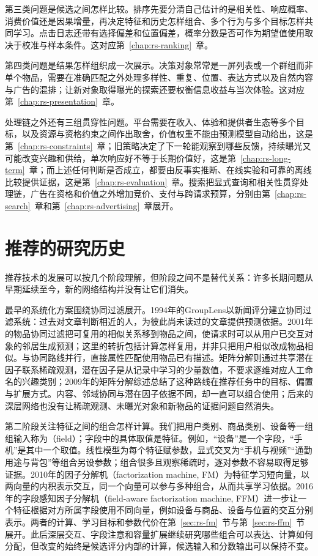第三类问题是候选之间怎样比较。排序先要分清自己估计的是相关性、响应概率、消费价值还是因果增量，再决定特征和历史怎样组合、多个行为与多个目标怎样共同学习。点击日志还带有选择偏差和位置偏差，概率分数是否可作为期望值使用取决于校准与样本条件。这对应第~\ref{chap:rs-ranking}~章。

第四类问题是结果怎样组织成一次展示。决策对象常常是一屏列表或一个群组而非单个物品，需要在准确匹配之外处理多样性、重复、位置、表达方式以及自然内容与广告的混排；让新对象取得曝光的探索还要权衡信息收益与当次体验。这对应第~\ref{chap:rs-presentation}~章。

处理链之外还有三组贯穿性问题。平台需要在收入、体验和提供者生态等多个目标，以及资源与资格约束之间作出取舍，价值权重不能由预测模型自动给出，这是第~\ref{chap:rs-constraints}~章；旧策略决定了下一轮能观察到哪些反馈，持续曝光又可能改变兴趣和供给，单次响应好不等于长期价值好，这是第~\ref{chap:rs-long-term}~章；而上述任何判断是否成立，都要由反事实推断、在线实验和可靠的离线比较提供证据，这是第~\ref{chap:rs-evaluation}~章。搜索把显式查询和相关性贯穿处理链，广告在资格和价值之外增加竞价、支付与跨请求预算，分别由第~\ref{chap:rs-search}~章和第~\ref{chap:rs-advertising}~章展开。

\section{推荐的研究历史}
\label{sec:rs-development}

推荐技术的发展可以按几个阶段理解，但阶段之间不是替代关系：许多长期问题从早期延续至今，新的网络结构并没有让它们消失。

最早的系统化方案围绕协同过滤展开。1994年的GroupLens以新闻评分建立协同过滤系统：过去对文章判断相近的人，为彼此尚未读过的文章提供预测依据。2001年的物品协同过滤把可复用的相似关系移到物品之间，使请求时可以从用户已交互对象的邻居生成预测；这里的转折包括计算怎样复用，并非只把用户相似改成物品相似。与协同路线并行，直接属性匹配使用物品已有描述。矩阵分解则通过共享潜在因子联系稀疏观测，潜在因子是从记录中学习的少量数值，不要求逐维对应人工命名的兴趣类别；2009年的矩阵分解综述总结了这种路线在推荐任务中的目标、偏置与扩展方式。内容、邻域协同与潜在因子依据不同，却一直可以组合使用；后来的深层网络也没有让稀疏观测、未曝光对象和新物品的证据问题自然消失。

第二阶段关注特征之间的组合怎样计算。我们把用户类别、商品类别、设备等一组组输入称为（field）；字段中的具体取值是特征。例如，“设备”是一个字段，“手机”是其中一个取值。线性模型为每个特征赋参数，显式交叉为“手机与视频”“通勤用途与背包”等组合另设参数；组合很多且观察稀疏时，逐对参数不容易取得足够证据。2010年的因子分解机（factorization machine, FM）为特征学习短向量，以两向量的内积表示交互，同一个向量可以参与多种组合，从而共享学习依据。2016年的字段感知因子分解机（field-aware factorization machine, FFM）进一步让一个特征根据对方所属字段使用不同向量，例如设备与商品、设备与位置的交互分别表示。两者的计算、学习目标和参数代价在第~\ref{sec:rs-fm}~节与第~\ref{sec:rs-ffm}~节展开。此后深层交互、字段注意和容量扩展继续研究哪些组合可以表达、计算如何分配，但改变的始终是候选评分内部的计算，候选输入和分数输出可以保持不变。

